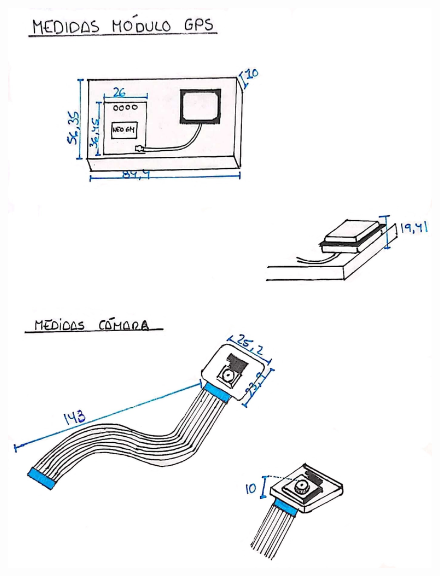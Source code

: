 \begin{figure}[ht!]
\begin{minipage}{0.45\linewidth}
		\includegraphics[width=\linewidth]{figs/cap5/planos3.jpeg}
		\caption*{\centering}
	\end{minipage}
	\hspace{1cm}
	\begin{minipage}{0.45\linewidth}
		\centering

\end{minipage}
\end{figure}
